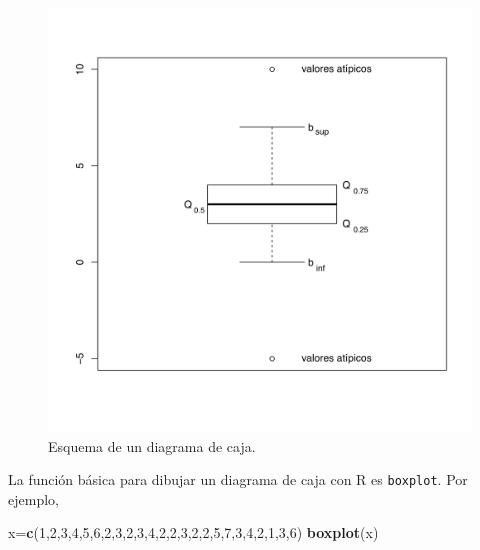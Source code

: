 \documentclass[]{book}
\newenvironment{Shaded}{\begin{snugshade}}{\end{snugshade}}
\newcommand{\DecValTok}[1]{\textcolor[rgb]{0.00,0.00,0.81}{#1}}
\newcommand{\KeywordTok}[1]{\textcolor[rgb]{0.13,0.29,0.53}{\textbf{#1}}}
\newcommand{\NormalTok}[1]{#1}
\theoremstyle{definition}
\theoremstyle{definition}
\theoremstyle{definition}
\theoremstyle{remark}
\begin{document}
\begin{figure}

{\centering \includegraphics{AprendeR-Parte-I_files/figure-html/boxplotgen} 

}

\caption{Esquema de un diagrama de caja.}\label{fig:boxplot}
\end{figure}

La función básica para dibujar un diagrama de caja con R es \texttt{boxplot}. Por ejemplo,

\begin{Shaded}
\begin{Highlighting}[]
\NormalTok{x=}\KeywordTok{c}\NormalTok{(}\DecValTok{1}\NormalTok{,}\DecValTok{2}\NormalTok{,}\DecValTok{3}\NormalTok{,}\DecValTok{4}\NormalTok{,}\DecValTok{5}\NormalTok{,}\DecValTok{6}\NormalTok{,}\DecValTok{2}\NormalTok{,}\DecValTok{3}\NormalTok{,}\DecValTok{2}\NormalTok{,}\DecValTok{3}\NormalTok{,}\DecValTok{4}\NormalTok{,}\DecValTok{2}\NormalTok{,}\DecValTok{2}\NormalTok{,}\DecValTok{3}\NormalTok{,}\DecValTok{2}\NormalTok{,}\DecValTok{2}\NormalTok{,}\DecValTok{5}\NormalTok{,}\DecValTok{7}\NormalTok{,}\DecValTok{3}\NormalTok{,}\DecValTok{4}\NormalTok{,}\DecValTok{2}\NormalTok{,}\DecValTok{1}\NormalTok{,}\DecValTok{3}\NormalTok{,}\DecValTok{6}\NormalTok{)}
\KeywordTok{boxplot}\NormalTok{(x)}
\end{Highlighting}
\end{Shaded}
\end{document}

